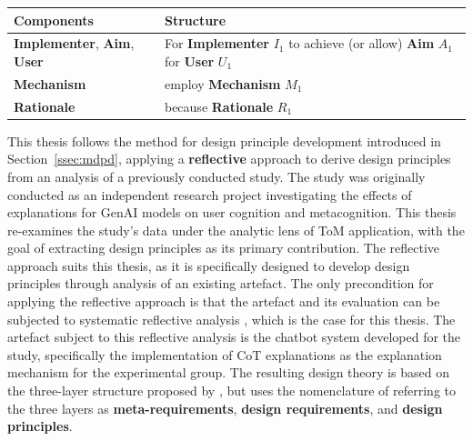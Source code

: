 \begin{ctable}
    \centering
    \begin{tabularx}{\textwidth}{l X}
        \toprule
       \textbf{Components} & \textbf{Structure} \\
        \midrule
        \textbf{Implementer}, \textbf{Aim}, \textbf{User} & For \textbf{Implementer} $I_1$ to achieve (or allow) \textbf{Aim} $A_1$ for \textbf{User} $U_1$ \\
        \textbf{Mechanism} & employ \textbf{Mechanism} $M_1$ \\
        \textbf{Rationale} & because \textbf{Rationale} $R_1$ \\
        \bottomrule
    \end{tabularx}
    \caption[Components of design principles]{Simplified components of a \ac{DP} adapted from \parencite{Gregor2020}, with context and enactors omitted as justified in the text.}
    \label{tab:example-dp}
\end{ctable}

This thesis follows the method for design principle development introduced in Section~\ref{ssec:mdpd}, applying a \textbf{reflective} approach to derive design principles from an analysis of a previously conducted study. The study was originally conducted as an independent research project investigating the effects of explanations for \ac{GenAI} models on user cognition and metacognition. This thesis re-examines the study's data under the analytic lens of \ac{ToM} application, with the goal of extracting design principles as its primary contribution. The reflective approach suits this thesis, as it is specifically designed to develop design principles through analysis of an existing artefact. The only precondition for applying the reflective approach is that the artefact and its evaluation can be subjected to systematic reflective analysis \parencite{Moeller2020}, which is the case for this thesis. The artefact subject to this reflective analysis is the chatbot system developed for the study, specifically the implementation of \ac{CoT} explanations as the explanation mechanism for the experimental group. The resulting design theory is based on the three-layer structure proposed by \textcite{Moeller2020}, but uses the nomenclature of \textcite{Herm2022} referring to the three layers as \textbf{meta-requirements}, \textbf{design requirements}, and \textbf{design principles}.

